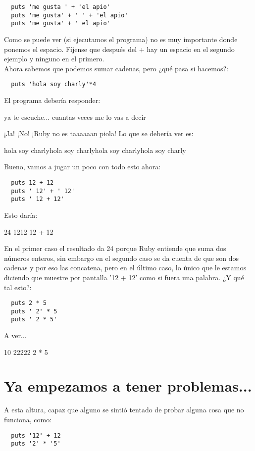 \begin{lstlisting}
  puts 'me gusta ' + 'el apio'
  puts 'me gusta' + ' ' + 'el apio'
  puts 'me gusta' + ' el apio'
\end{lstlisting}

Como se puede ver (si ejecutamos el programa) no es muy importante donde ponemos el espacio. Fíjense que después del + hay un espacio en el segundo ejemplo y ninguno en el primero.\\%

Ahora sabemos que podemos sumar cadenas, pero ¿qué pasa si hacemos?:

\begin{lstlisting}
  puts 'hola soy charly'*4
\end{lstlisting}

El programa debería responder:
\begin{console-output}
  ya te escuche... cuantas veces me lo vas a decir
\end{console-output}

¡Ja! ¡No! ¡Ruby no es taaaaaan piola! Lo que se debería ver es:

\begin{console-output}
hola soy charlyhola soy charlyhola soy charlyhola soy charly
\end{console-output}

Bueno, vamos a jugar un poco con todo esto ahora:
\begin{lstlisting}
  puts 12 + 12
  puts ' 12' + ' 12'
  puts ' 12 + 12'
\end{lstlisting}

Esto daría:
\begin{console-output}
  24
  1212
  12 + 12
\end{console-output}

En el primer caso el resultado da 24 porque Ruby entiende que suma dos números enteros, sin embargo en el segundo caso se da cuenta de que son dos cadenas y por eso las concatena, pero en el último caso, lo único que le estamos diciendo que muestre por pantalla '12 + 12' como si fuera una palabra. ¿Y qué tal esto?:
\begin{lstlisting}
  puts 2 * 5
  puts ' 2' * 5
  puts ' 2 * 5'
\end{lstlisting}

A ver...
\begin{console-output}
10
22222
2 * 5
\end{console-output}

\section{Ya empezamos a tener problemas...}
A esta altura, capaz que alguno se sintió tentado de probar alguna cosa que no funciona, como:
\begin{lstlisting}
  puts '12' + 12
  puts '2' * '5'
\end{lstlisting}

